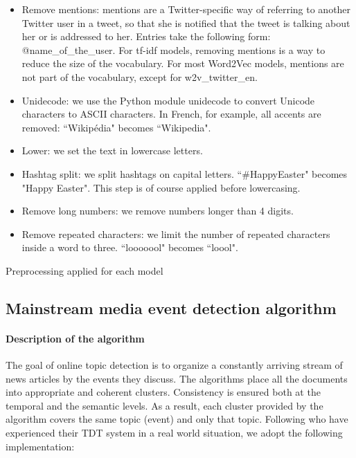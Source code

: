 \begin{itemize}
\item Remove mentions: mentions are a Twitter-specific way of referring to another Twitter user in a tweet, so that she is notified that the tweet is talking about her or is addressed to her. Entries take the following form: @name\_of\_the\_user. For tf-idf models, removing mentions is a way to reduce the size of the vocabulary. For most Word2Vec models, mentions are not part of the vocabulary, except for w2v\_twitter\_en.
\item Unidecode: we use the Python module unidecode to convert Unicode characters to ASCII characters. In French, for example, all accents are removed: ``Wikip\'{e}dia" becomes ``Wikipedia".
\item Lower: we set the text in lowercase letters.
\item Hashtag split: we split hashtags on capital letters. ``\#HappyEaster" becomes "Happy Easter". This step is of course applied before lowercasing.
\item Remove long numbers: we remove numbers longer than 4 digits.
\item Remove repeated characters: we limit the number of repeated characters inside a word to three. ``looooool" becomes ``loool".
\end{itemize}

\begin{table}
\begin{center}
\makebox[\textwidth][c]{}
\end{center}
\caption{Preprocessing applied for each model \label{Tab:preprocessing}}
\end{table}



\subsection{Mainstream media event detection algorithm\label{Sec:event_algo}}

\paragraph{Description of the algorithm}

The goal of online topic detection is to organize a constantly arriving stream of news articles by the events they discuss. The algorithms place all the documents into appropriate and coherent clusters. Consistency is ensured both at the temporal and the semantic levels. As a result, each cluster provided by the algorithm covers the same topic (event) and only that topic. Following \citet{Allan2005} who have experienced their TDT system in a real world situation, we adopt the following implementation:

